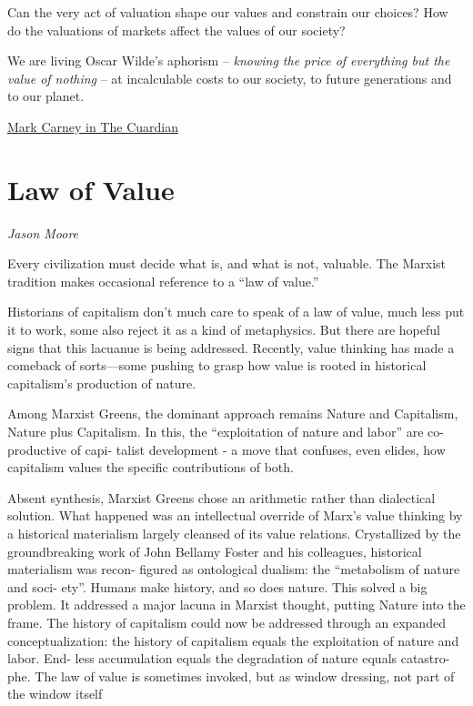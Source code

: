 \documentclass[
]{book}
\begin{document}
Can the very act of valuation shape our values and constrain our choices? How do the valuations of markets affect the values of our society?

We are living Oscar Wilde's aphorism -- \emph{knowing the price of everything but the value of nothing} -- at incalculable costs to our society, to future generations and to our planet.

\href{https://www.theguardian.com/business/2021/mar/13/crisis-in-values-exclusive-extract-mark-carneys-book}{Mark Carney in The Cuardian}

\hypertarget{law-of-value}{%
\chapter{Law of Value}\label{law-of-value}}

\emph{Jason Moore}

Every civilization must decide what is, and what is not, valuable.
The Marxist tradition makes occasional reference to a ``law of
value.''

Historians of
capitalism don't much care to speak of a law of value, much less put
it to work, some also reject it as
a kind of metaphysics. But there are hopeful signs that
this lacuanue is being addressed. Recently, value thinking has made a
comeback of sorts---some pushing to grasp how value is rooted in
historical capitalism's production of nature.

Among Marxist Greens, the dominant
approach remains Nature and Capitalism, Nature plus Capitalism. In
this, the ``exploitation of nature and labor'' are co-productive of capi-
talist development - a move that confuses, even elides,
how capitalism values the specific contributions of both.

Absent synthesis, Marxist Greens chose an arithmetic rather than
dialectical solution. What happened was an intellectual override of
Marx's value thinking by a historical materialism largely cleansed of
its value relations. Crystallized by the groundbreaking work of John
Bellamy Foster and his colleagues, historical materialism was recon-
figured as ontological dualism: the ``metabolism of nature and soci-
ety''. Humans make history, and so does nature.
This solved a big problem. It addressed a major lacuna in Marxist
thought, putting Nature into the frame. The history of capitalism
could now be addressed through an expanded conceptualization: the
history of capitalism equals the exploitation of nature and labor. End-
less accumulation equals the degradation of nature equals catastro-
phe. The law of value is sometimes invoked, but as window dressing,
not part of the window itself
\end{document}
